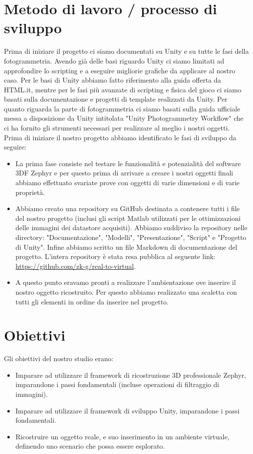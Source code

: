 \documentclass[12pt]{report}
\begin{document}
\section{Metodo di lavoro / processo di sviluppo}
Prima di iniziare il progetto ci siamo documentati su Unity e su tutte le fasi della fotogrammetria. Avendo già delle basi riguardo Unity ci siamo limitati ad approfondire lo scripting e a eseguire migliorie grafiche da  applicare al nostro caso. Per le basi di Unity abbiamo fatto riferimento alla guida offerta da HTML.it, mentre per le fasi più avanzate di scripting e fisica del gioco ci siamo basati sulla documentazione e progetti di template realizzati da Unity.
Per quanto riguarda la parte di fotogrammetria ci siamo basati sulla guida ufficiale messa a disposizione da Unity intitolata "Unity Photogrammetry Workflow" che ci ha fornito gli strumenti necessari per realizzare al meglio i nostri oggetti.
Prima di iniziare il nostro progetto abbiamo identificato le fasi di sviluppo da seguire:
\begin{itemize}
    \item La prima fase consiste nel testare le funzionalità e potenzialità del software 3DF Zephyr e per questo prima di arrivare a creare i nostri oggetti finali abbiamo effettuato svariate prove con oggetti di varie dimensioni e di varie propriet\`a.
    \item Abbiamo creato una repository su GitHub destinata a contenere tutti i file del nostro progetto (inclusi gli script Matlab utilizzati per le ottimizzazioni delle immagini dei datastore acquisiti). Abbiamo suddiviso la repository nelle directory: "Documentazione", "Modelli", "Presentazione", "Script" e "Progetto di Unity". Infine abbiamo scritto un file Markdown di documentazione del progetto. L'intera repository è stata resa pubblica al seguente link: \url{https://github.com/zk-g/real-to-virtual}.
    \item A questo punto eravamo pronti a realizzare l'ambientazione ove inserire il nostro oggetto ricostruito. Per questo abbiamo realizzato una scaletta con tutti gli elementi in ordine da inserire nel progetto. 
\end{itemize}
\section{Obiettivi}
Gli obiettivi del nostro studio erano:
\begin{itemize}
\item Imparare ad utilizzare il framework di ricostruzione 3D professionale Zephyr, imparandone i passi fondamentali (incluse operazioni di filtraggio di immagini).
\item Imparare ad utilizzare il framework di sviluppo Unity, imparandone i passi fondamentali.
\item Ricostruire un oggetto reale, e suo inserimento in un ambiente virtuale, definendo uno scenario che possa essere esplorato.
\end{itemize}
\end{document}
